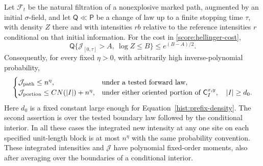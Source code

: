 \begin{lemma}\label{score:hellinger}
Let $\mathcal F_t$ be the natural filtration of a nonexplosive marked path,
augmented by an initial $\sigma$-field, and let $\mathsf Q\ll\mathsf P$ be a change of law up to a
finite stopping time $\tau$, with density $Z$ there and with intensities $rb$ relative to
the reference intensities $r$ conditional on that initial information.
For the cost in \eqref{score:hellinger-cost},
\begin{equation}\label{score:hellinger-inequality}
 \mathsf Q\{\mathcal J_{[0,\tau]}>A,\ \log Z\le B\}
          \le e^{(B-A)/2}.
\end{equation}
Consequently, for every fixed $\eta>0$, with arbitrarily high
inverse-polynomial probability,
\begin{equation}\label{score:action-bounds}
 \begin{cases}
 \mathcal J_{\rm path}\le n^\eta,&\text{under a tested forward law},\\
 \mathcal J_{\rm portion}\le C N(|I|)+n^\eta,
       &\text{under either oriented portion of }\mathsf C_I^{x,y},\quad |I|\ge d_0.
 \end{cases}
\end{equation}
Here $d_0$ is a fixed constant large enough for
Equation~\eqref{hist:prefix-density}.
The second assertion is over the tested boundary law followed by the
conditional interior.  In all these cases the integrated new intensity
at any one site on each specified unit-length block is at most $n^\eta$
with the same probability convention.  These integrated intensities and
$\mathcal J$ have polynomial fixed-order moments, also after averaging
over the boundaries of a conditional interior.
\end{lemma}

